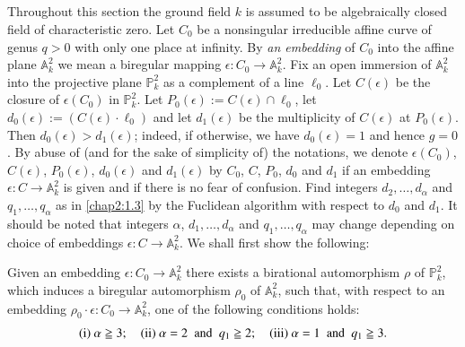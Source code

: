 \subsection{}\label{chap2:4.1}
Throughout this section the ground field $k$ is assumed to be
algebraically closed field of characteristic zero. Let $C_{0}$ be a
nonsingular irreducible affine curve of genus $q>0$ with only one
place at infinity. By {\em an embedding} of $C_{0}$ into the affine
plane $\mathbb{A}^{2}_{k}$ we mean a biregular mapping
$\epsilon:C_{0}\to \mathbb{A}^{2}_{k}$. Fix an open immersion of
$\mathbb{A}^{2}_{k}$ into the projective plane $\mathbb{P}^{2}_{k}$ as
a complement of a line $\ell_{0}$. Let $C(\epsilon)$ be the closure of
$\epsilon(C_{0})$ in $\mathbb{P}^{2}_{k}$. Let
$P_{0}(\epsilon):=C(\epsilon)\cap \ell_{0}$, let
$d_{0}(\epsilon):=(C(\epsilon)\cdot \ell_{0})$ and let
$d_{1}(\epsilon)$ be the multiplicity of $C(\epsilon)$ at
$P_{0}(\epsilon)$. Then $d_{0}(\epsilon)>d_{1}(\epsilon)$; indeed, if
otherwise, we have $d_{0}(\epsilon)=1$ and hence $g=0$. By abuse of
(and for the sake of simplicity of) the notations, we denote
$\epsilon(C_{0})$, $C(\epsilon)$, $P_{0}(\epsilon)$, $d_{0}(\epsilon)$
and $d_{1}(\epsilon)$ by $C_{0}$, $C$, $P_{0}$, $d_{0}$ and $d_{1}$ if
an embedding $\epsilon:C\to \mathbb{A}^{2}_{k}$ is given and if there
is no fear of confusion. Find integers $d_{2},\ldots,d_{\alpha}$ and
$q_{1},\ldots,q_{\alpha}$ as in \ref{chap2:1.3} by the Fuclidean algorithm
with respect to $d_{0}$ and $d_{1}$. It should be noted that integers
$\alpha$, $d_{1},\ldots, d_{\alpha}$ and $q_{1},\ldots,q_{\alpha}$ may
change depending on choice of embeddings $\epsilon:C\to
\mathbb{A}^{2}_{k}$. We shall first show the following:

\begin{lemma*}
Given an embedding $\epsilon:C_{0}\to \mathbb{A}^{2}_{k}$ there exists
a birational automorphism $\rho$ of $\mathbb{P}^{2}_{k}$, which
induces a biregular automorphism $\rho_{0}$ of $\mathbb{A}^{2}_{k}$,
such that, with respect to an embedding $\rho_{0}\cdot
\epsilon:C_{0}\to \mathbb{A}^{2}_{k}$, one of the following conditions
holds:
$$
{\rm(i)}~\alpha\geqq 3;\quad {\rm(ii)}~\alpha=2\;\text{ and }\;
q_{1}\geqq 2;\quad {\rm(iii)}~\alpha=1\;\text{ and }\; q_{1}\geqq 3.
$$
\end{lemma*}

